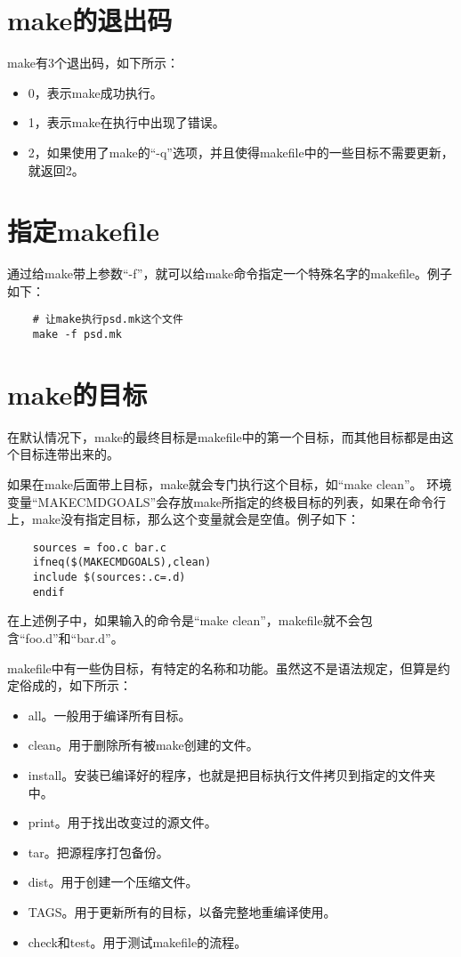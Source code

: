 \documentclass[a4paper,left=2.5cm,right=2.5cm,11pt]{article}
\begin{document}
\tableofcontents

\clearpage

\section{make的退出码}
	make有3个退出码，如下所示：
	\begin{itemize}
		\item 0，表示make成功执行。
		\item 1，表示make在执行中出现了错误。
		\item 2，如果使用了make的“-q”选项，并且使得makefile中的一些目标不需要更新，就返回2。
	\end{itemize}

\section{指定makefile}
	通过给make带上参数“-f”，就可以给make命令指定一个特殊名字的makefile。例子如下：
	\begin{lstlisting}
	# 让make执行psd.mk这个文件
	make -f psd.mk
	\end{lstlisting}

\section{make的目标}
	在默认情况下，make的最终目标是makefile中的第一个目标，而其他目标都是由这个目标连带出来的。\par

	如果在make后面带上目标，make就会专门执行这个目标，如“make clean”。
	环境变量“MAKECMDGOALS”会存放make所指定的终极目标的列表，如果在命令行上，make没有指定目标，那么这个变量就会是空值。例子如下：
	\begin{lstlisting}
	sources = foo.c bar.c
	ifneq($(MAKECMDGOALS),clean)
	include $(sources:.c=.d)
	endif
	\end{lstlisting}

	在上述例子中，如果输入的命令是“make clean”，makefile就不会包含“foo.d”和“bar.d”。\par

	makefile中有一些伪目标，有特定的名称和功能。虽然这不是语法规定，但算是约定俗成的，如下所示：
	\begin{itemize}
		\item all。一般用于编译所有目标。
		\item clean。用于删除所有被make创建的文件。
		\item install。安装已编译好的程序，也就是把目标执行文件拷贝到指定的文件夹中。
		\item print。用于找出改变过的源文件。
		\item tar。把源程序打包备份。
		\item dist。用于创建一个压缩文件。
		\item TAGS。用于更新所有的目标，以备完整地重编译使用。
		\item check和test。用于测试makefile的流程。
	\end{itemize}
\end{document}
